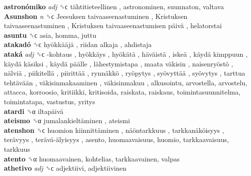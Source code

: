 \textbf{astronómiko} \emph{adj}  ␝ϲ   tähtitieteellinen , astronominen, suunnaton, valtava  \\
\textbf{Asunshon} \emph{n}  ␝ϲ   Jeesuksen taivaaseenastuminen ,  Kristuksen taivaaseenastuminen ,  Kristuksen taivaaseenastumisen päivä , helatorstai  \\
\textbf{asuntu} ␝ϲ  asia, homma, juttu  \\
\textbf{atakadó} ␝ϲ   hyökkääjä ,  riidan alkaja , ahdistaja  \\
\textbf{ataká} \emph{adj}  ␝ϲ   -kohtaus ,  hyökkäys ,  hyökätä ,  häväistä ,  iskeä ,  käydä kimppuun ,  käydä käsiksi ,  käydä päälle ,  lähestymistapa ,  maata väkisin ,  naisenryöstö ,  nälviä ,  piikitellä ,  piirittää ,  rynnäkkö ,  ryöpytys ,  syövyttää ,  syövytys ,  tarttua tehtävään ,  väkisinmakaaminen ,  väkisinmakuu , alkusointu, arvostella, arvostelu, attacca, korroosio, kritiikki, kritisoida, raiskata, raiskaus, toimintasuunnitelma, toimintatapa, vastustus, yritys  \\
\textbf{atardi} ␝α   iltapäivä   \\
\textbf{ateismo} ␝α   jumalankieltäminen , ateismi  \\
\textbf{atenshon} ␝ϲ   huomion kiinnittäminen ,  näöntarkkuus ,  tarkkanäköisyys ,  terävyys ,  terävä-älyisyys , asento, huomaavaisuus, huomio, tarkkaavaisuus, tarkkuus  \\
\textbf{atento} ␝α  huomaavainen, kohtelias, tarkkaavainen, valpas  \\
\textbf{athetivo} \emph{adj}  ␝ϲ  adjektiivi, adjektiivinen  \\
